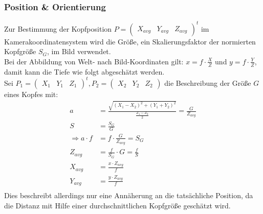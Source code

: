 \subsubsection{Position \& Orientierung}
\label{OpenFace_Pos_Ori}
Zur Bestimmung der Kopfposition $P= \begin{pmatrix}
X_{avg} & Y_{avg} & Z_{avg}
\end{pmatrix}^t$ im Kamerakoordinatensystem wird die Größe, ein Skalierungsfaktor der normierten Kopfgröße $S_G$, im Bild verwendet.\\
Bei der Abbildung von Welt- nach Bild-Koordinaten gilt: $x=f\cdot \frac{X}{Z}$ und $ y=f\cdot \frac{Y}{Z}$, damit kann die Tiefe wie folgt abgeschätzt werden.\\
Sei $P_1 = \begin{pmatrix}
X_1&Y_1&Z_1
\end{pmatrix}^t, P_2= \begin{pmatrix}
X_2&Y_2&Z_2
\end{pmatrix}$ die Beschreibung der Größe $G$ eines Kopfes mit:\\
\begin{align*}
a &= \frac{\sqrt{(X_1-X_2)^2+(Y_1+Y_2)^2}}{\frac{Z_1-Z_2}{2}} =\frac{G}{Z_{avg}}\\
S &= \frac{S_G}{G}\\
\Rightarrow a\cdot f &= f\cdot\frac{G}{Z_{avg}} = S_G\\
Z_{avg} &= \frac{f}{S_G}\cdot G = \frac{f}{S}\\
X_{avg} &= \frac{x \cdot Z_{avg}}{f}\\
Y_{avg} &= \frac{y \cdot Z_{avg}}{f}\\
\end{align*}
Dies beschreibt allerdings nur eine Annäherung an die tatsächliche Position, da die Distanz mit Hilfe einer durchschnittlichen Kopfgröße geschätzt wird.\cite{OpenFace}
